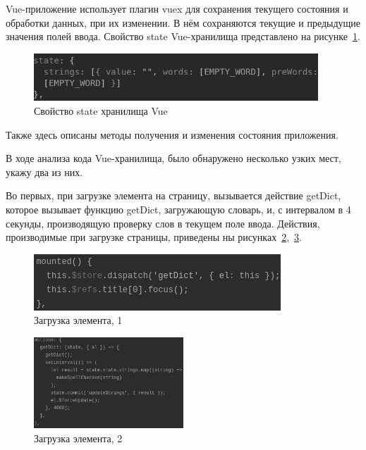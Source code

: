 Vue-приложение использует плагин vuex для сохранения текущего состояния и обработки данных, при их изменении. В нём сохраняются текущие и предыдущие значения полей ввода. Свойство state Vue-хранилища представлено на рисунке~\ref{img:state}.

\begin{figure}[H]
  \centering
  \includegraphics[width=0.95\textwidth]{assets/images/practical/state.png}
  \caption{Свойство state хранилища Vue}
  \label{img:state}
\end{figure}

Также здесь описаны методы получения и изменения состояния приложения.

В ходе анализа кода Vue-хранилища, было обнаружено несколько узких мест, укажу два из них.

Во первых, при загрузке элемента на страницу, вызывается действие getDict, которое вызывает функцию getDict, загружающую словарь, и, с интервалом в 4 секунды, производящую проверку слов в текущем поле ввода. Действия, производимые при загрузке страницы, приведены ны рисунках~\ref{img:mount},~\ref{img:getDict}.

\begin{figure}[H]
  \centering
  \includegraphics[height=0.1\textheight]{assets/images/practical/mounted.png}
  \caption{Загрузка элемента, 1}
  \label{img:mount}
\end{figure}

\begin{figure}[H]
  \centering
  \includegraphics[width=0.5\textwidth]{assets/images/practical/getDict.png}
  \caption{Загрузка элемента, 2}
  \label{img:getDict}
\end{figure}

